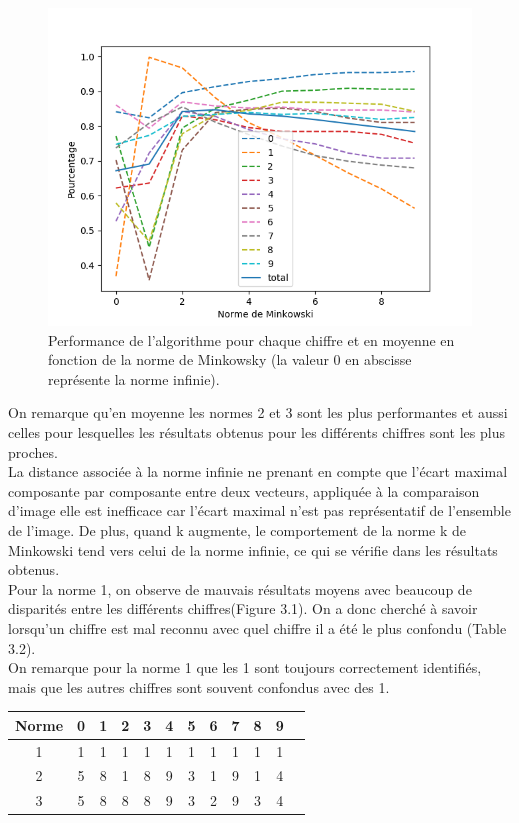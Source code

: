 \documentclass[a4paper,11pt,twoside]{report}
\begin{document}
\begin{figure}[H]
  	\includegraphics[width=\linewidth]{Graphs/normsminky.png}
  	\caption{Performance de l'algorithme pour chaque chiffre et en moyenne en fonction de la norme de Minkowsky (la valeur 0 en abscisse représente la norme infinie).}
\end{figure}

On remarque qu'en moyenne les normes 2 et 3 sont les plus performantes et aussi celles pour lesquelles les résultats obtenus pour les différents chiffres sont les plus proches. \\
La distance associée à la norme infinie ne prenant en compte que l'écart maximal composante par composante entre deux vecteurs, appliquée à la comparaison d'image elle est inefficace car l'écart maximal n'est pas représentatif de l'ensemble de l'image. De plus, quand k augmente, le comportement de la norme k de Minkowski tend vers celui de la norme infinie, ce qui se vérifie dans les résultats obtenus.\\ 
Pour la norme 1, on observe de mauvais résultats moyens avec beaucoup de disparités entre les différents chiffres(Figure 3.1). On a donc cherché à savoir lorsqu'un chiffre est mal reconnu avec quel chiffre il a été le plus confondu (Table 3.2).\\
On remarque pour la norme 1 que les 1 sont toujours correctement identifiés, mais que les autres chiffres sont souvent confondus avec des 1.

\begin{center}
\begin{tabular}{ |c||c|c|c|c|c|c|c|c|c|c|c| } 
\hline
 Norme & 0 & 1 & 2 & 3 & 4 & 5 & 6 & 7 & 8 & 9 \\ 
  \hline
  \hline
  1 & 1 & 1 & 1 & 1 & 1 & 1 & 1 & 1 & 1 & 1 \\
 \hline
  2 & 5 & 8 & 1 & 8 & 9 & 3 & 1 & 9 & 1 & 4 \\
 \hline
  3 & 5 & 8 & 8 & 8 & 9 & 3 & 2 & 9 & 3 & 4 \\
 \hline
\end{tabular}
\end{center}
\end{document}
